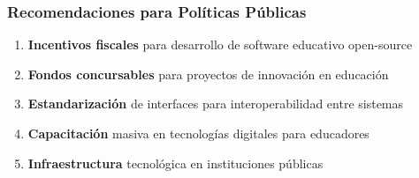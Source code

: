 \subsubsection{Recomendaciones para Políticas Públicas}

\begin{enumerate}
\item \textbf{Incentivos fiscales} para desarrollo de software educativo open-source
\item \textbf{Fondos concursables} para proyectos de innovación en educación
\item \textbf{Estandarización} de interfaces para interoperabilidad entre sistemas
\item \textbf{Capacitación} masiva en tecnologías digitales para educadores
\item \textbf{Infraestructura} tecnológica en instituciones públicas
\end{enumerate}